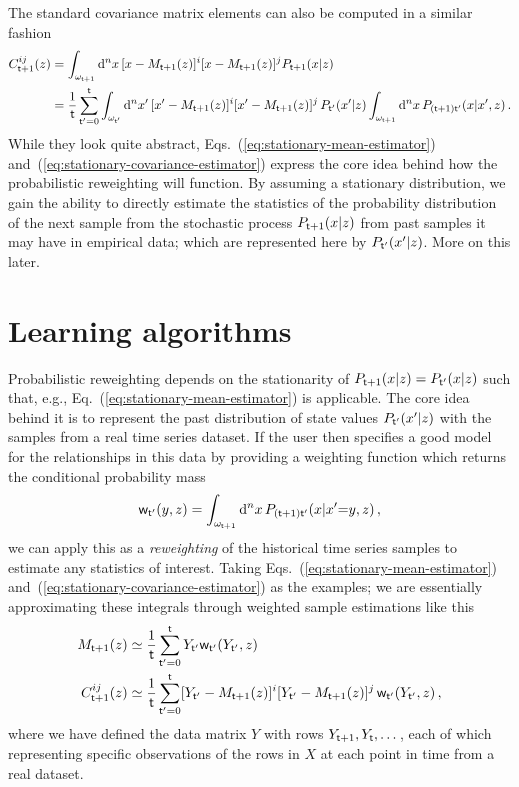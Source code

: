 The standard covariance matrix elements can also be computed in a similar fashion
\begin{align}
C^{ij}_{{\sf t}+1}(z) &= \int_{\omega_{{\sf t}+1}}{\rm d}^nx \,[x-M_{{\sf t}+1}(z)
]^i[x-M_{{\sf t}+1}(z)]^jP_{{\sf t}+1}(x\vert z) \nonumber \\
&= \frac{1}{{\sf t}}\sum_{{\sf t}'=0}^{{\sf t}}\int_{\omega_{{\sf t}'}}{\rm d}^nx' \, [x'-M_{{\sf t}+1}(z)]^i[x'-M_{{\sf t}+1}(z)]^j \,P_{{\sf t}'}(x'\vert z) \int_{\omega_{{\sf t}+1}}{\rm d}^nx \, P_{({\sf t}+1){\sf t}'}(x\vert x',z) \label{eq:stationary-covariance-estimator}\,.
\end{align}
While they look quite abstract, Eqs.~(\ref{eq:stationary-mean-estimator}) and~(\ref{eq:stationary-covariance-estimator}) express the core idea behind how the probabilistic reweighting will function. By assuming a stationary distribution, we gain the ability to directly estimate the statistics of the probability distribution of the next sample from the stochastic process $P_{{\sf t}+1}(x\vert z)$ from past samples it may have in empirical data; which are represented here by $P_{{\sf t}'}(x'\vert z)$. More on this later.

\section{\sffamily Learning algorithms}

Probabilistic reweighting depends on the stationarity of $P_{{\sf t}+1}(x\vert z)=P_{{\sf t}'}(x\vert z)$ such that, e.g., Eq.~(\ref{eq:stationary-mean-estimator}) is applicable. The core idea behind it is to represent the past distribution of state values $P_{{\sf t}'}(x'\vert z)$ with the samples from a real time series dataset. If the user then specifies a good model for the relationships in this data by providing a weighting function which returns the conditional probability mass
\begin{align}
{\sf w}_{{\sf t}'}(y,z) = \int_{\omega_{{\sf t}+1}} {\rm d}^nx \, P_{({\sf t}+1){\sf t}'}(x\vert x'{=}y,z) \,,  
\end{align}
we can apply this as a \emph{reweighting} of the historical time series samples to estimate any statistics of interest. Taking Eqs.~(\ref{eq:stationary-mean-estimator}) and~(\ref{eq:stationary-covariance-estimator}) as the examples; we are essentially approximating these integrals through weighted sample estimations like this
\begin{align}
M_{{\sf t}+1}(z) &\simeq \frac{1}{{\sf t}}\sum^{{\sf t}}_{{\sf t}'=0}Y_{{\sf t}'} {\sf w}_{{\sf t}'}(Y_{{\sf t}'},z) \label{eq:mean-reweighting} \\
C^{ij}_{{\sf t}+1}(z) &\simeq \frac{1}{{\sf t}}\sum^{{\sf t}}_{{\sf t}'=0}[Y_{{\sf t}'}-M_{{\sf t}+1}(z)]^i[Y_{{\sf t}'}-M_{{\sf t}+1}(z)]^j \, {\sf w}_{{\sf t}'}(Y_{{\sf t}'},z) \label{eq:covariance-reweighting} \,,
\end{align}
where we have defined the data matrix $Y$ with rows $Y_{{\sf t}+1}, Y_{{\sf t}}, \dots$, each of which representing specific observations of the rows in $X$ at each point in time from a real dataset.

